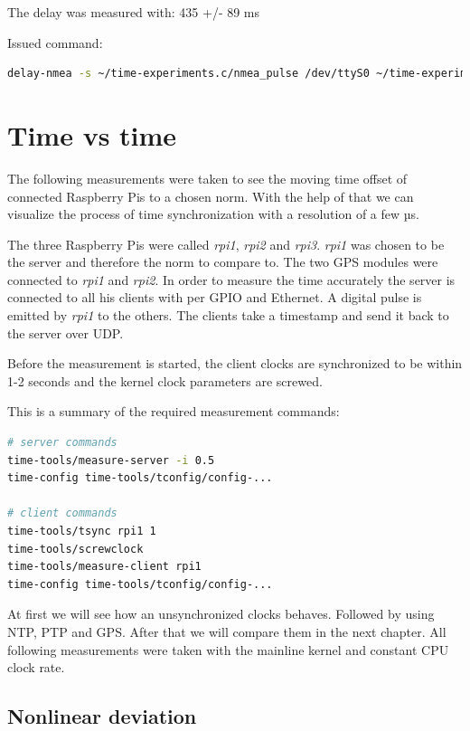 The delay was measured with: 435 +/- 89 ms

Issued command:

\begin{lstlisting}[language=bash]
delay-nmea -s ~/time-experiments.c/nmea_pulse /dev/ttyS0 ~/time-experiments.c/pps_pulse /dev/pps0
\end{lstlisting}

\section{Time vs time}

The following measurements were taken to see the moving time offset of connected Raspberry Pis to a chosen norm. With the help of that we can visualize the process of time synchronization with a resolution of a few µs.

The three Raspberry Pis were called \textit{rpi1}, \textit{rpi2} and \textit{rpi3}. \textit{rpi1} was chosen to be the server and therefore the norm to compare to. The two GPS modules were connected to \textit{rpi1} and \textit{rpi2}. In order to measure the time accurately the server is connected to all his clients with per GPIO and Ethernet. A digital pulse is emitted by \textit{rpi1} to the others. The clients take a timestamp and send it back to the server over UDP.

Before the measurement is started, the client clocks are synchronized to be within 1-2 seconds and the kernel clock parameters are screwed.

This is a summary of the required measurement commands:

\begin{lstlisting}[language=bash]
# server commands
time-tools/measure-server -i 0.5
time-config time-tools/tconfig/config-...

# client commands
time-tools/tsync rpi1 1
time-tools/screwclock
time-tools/measure-client rpi1
time-config time-tools/tconfig/config-...
\end{lstlisting}

At first we will see how an unsynchronized clocks behaves. Followed by using NTP, PTP and GPS. After that we will compare them in the next chapter. All following measurements were taken with the mainline kernel and constant CPU clock rate.

\subsection{Nonlinear deviation}


